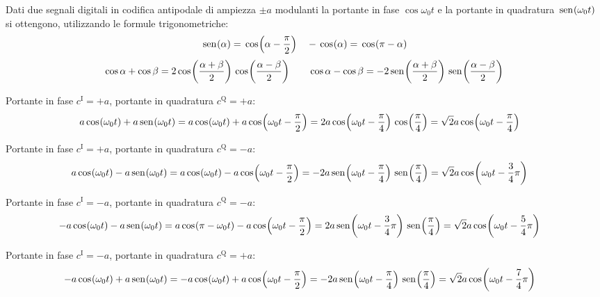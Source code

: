 Dati due segnali digitali in codifica antipodale di ampiezza $\pm a$ modulanti la portante in fase $\cos{\omega_0 t}$ e la portante in quadratura $\sen{\omega_0 t}$ si ottengono, utilizzando le formule trigonometriche: \[\sen{\alpha}=\cos{\alpha-\frac{\pi}{2}}\quad-\cos{\alpha}=\cos{\pi-\alpha}\] \[\Cos\alpha+\Cos\beta=2\cos{\frac{\alpha+\beta}{2}}\cos{\frac{\alpha-\beta}{2}}\qquad\Cos\alpha-\Cos\beta=-2\sen{\frac{\alpha+\beta}{2}}\sen{\frac{\alpha-\beta}{2}}\]
\begin{description}
	\footnotesize
	\item[Bit “11”] Portante in fase $c^\text{I}=+a$, portante in quadratura $c^\text{Q}=+a$:
	\[\begin{split}a\cos{\omega_0 t}+a\sen{\omega_0 t}&=a\cos{\omega_0 t}+a\cos{\omega_0 t-\frac{\pi}{2}}=2a\cos{\omega_0 t-\frac{\pi}{4}}\cos{\frac{\pi}{4}}=\sqrt{2}a\cos{\omega_0 t-\frac{\pi}{4}}\end{split}\]
	\item[Bit “10”] Portante in fase $c^\text{I}=+a$, portante in quadratura $c^\text{Q}=-a$:
	\[\begin{split}a\cos{\omega_0 t}-a\sen{\omega_0 t}&=a\cos{\omega_0 t}-a\cos{\omega_0 t-\frac{\pi}{2}}=-2a\sen{\omega_0 t-\frac{\pi}{4}}\sen{\frac{\pi}{4}}=\sqrt{2}a\cos{\omega_0 t-\frac{3}{4}\pi}\end{split}\]
	\item[Bit “00”] Portante in fase $c^\text{I}=-a$, portante in quadratura $c^\text{Q}=-a$:
	\[\begin{split}-a\cos{\omega_0 t}-a\sen{\omega_0 t}&=a\cos{\pi-\omega_0 t}-a\cos{\omega_0 t-\frac{\pi}{2}}=2a\sen{\omega_0 t-\frac{3}{4}\pi}\sen{\frac{\pi}{4}}=\sqrt{2}a\cos{\omega_0 t-\frac{5}{4}\pi}\end{split}\]
	\item[Bit “01”] Portante in fase $c^\text{I}=-a$, portante in quadratura $c^\text{Q}=+a$:
	\[\begin{split}-a\cos{\omega_0 t}+a\sen{\omega_0 t}&=-a\cos{\omega_0 t}+a\cos{\omega_0 t-\frac{\pi}{2}}=-2a\sen{\omega_0 t-\frac{\pi}{4}}\sen{\frac{\pi}{4}}=\sqrt{2}a\cos{\omega_0 t-\frac{7}{4}\pi}\end{split}\]	
\end{description}

